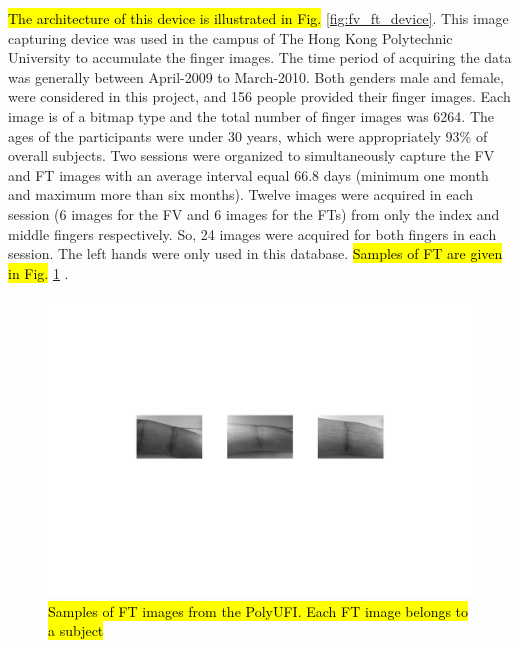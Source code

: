 \documentclass[review]{elsarticle}
\begin{document}
	\hl{The architecture of this device is illustrated in Fig.} \ref{fig:fv_ft_device}. 
	This image capturing device was used in the campus of The Hong Kong Polytechnic University to accumulate the finger images. The time period of acquiring the data was generally between April-2009 to March-2010. Both genders male and female, were considered in this project, and 156 people provided their finger images. Each image is of a bitmap type and the total number of finger images was 6264. The ages of the participants were under 30 years, which were appropriately 93\% of overall subjects. Two sessions were organized to simultaneously capture the FV and FT images with an average interval equal 66.8 days (minimum one month and maximum more than six months). Twelve images were acquired in each session (6 images for the FV and 6 images for the FTs) from only the index and middle fingers respectively. So, 24 images were acquired for both fingers in each session. The left hands were only used in this database. \hl{Samples of FT are given in Fig.} \ref{fig:ft_images} \cite{PolyUFinTexVei}.
		\begin{figure}[!h]
			\centering
			\includegraphics[page=1,scale=.57,trim=6cm 9.5cm 6cm 8cm,clip]{ft_fv_images.pdf}
			\caption{\hl{Samples of FT images from the PolyUFI. Each FT image belongs to a subject}}
			\label{fig:ft_images}
		\end{figure}
\end{document}
